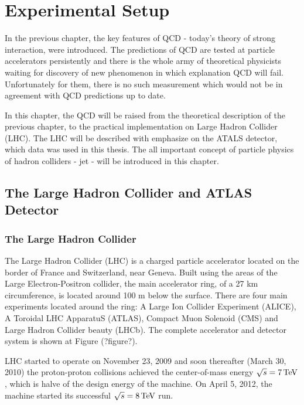\chapter{Experimental Setup}


In the previous chapter, the key features of QCD - today's theory of strong
interaction, were introduced. The predictions of QCD are tested at particle
accelerators persistently and there is the whole army of theoretical physicists
waiting for discovery of new phenomenon in which explanation QCD will fail.
Unfortunately for them, there is no such measurement which would not be in
agreement with QCD predictions up to date. 

In this chapter, the QCD will be raised from the theoretical description of the
previous chapter, to the practical implementation on Large Hadron Collider
(LHC). The LHC will be described with emphasize on the ATALS detector, which
data was used in this thesis. The all important concept of particle physics of
hadron colliders - jet - will be introduced in this chapter.

\section{The Large Hadron Collider and ATLAS Detector}

\subsection{The Large Hadron Collider}

The Large Hadron Collider (LHC) \cite{LHC, LHCPastPresentFuture} is a charged
particle accelerator located on the border of France and Switzerland, near
Geneva. Built using the areas of the Large Electron-Positron collider, the main
accelerator ring, of a 27 km circumference, is located around 100 m below the
surface. There are four main experiments located around the ring: A Large Ion
Collider Experiment (ALICE), A Toroidal LHC ApparatuS (ATLAS), Compact Muon
Solenoid (CMS) and Large Hadron Collider beauty (LHCb). The complete accelerator
and detector system is shown at Figure (?figure?).

LHC started to operate on November 23, 2009 and soon thereafter (March 30, 2010)
the proton-proton collisions achieved the center-of-mass energy $\sqrt{s} = 7
\,\text{TeV}$, which is halve of the design energy of the machine. On April 5, 2012, the
machine started its successful $\sqrt{s} = 8 \,\text{TeV}$ run.


